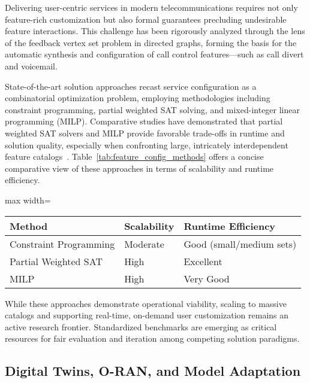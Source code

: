 \documentclass[sigconf]{acmart}
\begin{document}
Delivering user-centric services in modern telecommunications requires not only feature-rich customization but also formal guarantees precluding undesirable feature interactions. This challenge has been rigorously analyzed through the lens of the feedback vertex set problem in directed graphs, forming the basis for the automatic synthesis and configuration of call control features—such as call divert and voicemail.

State-of-the-art solution approaches recast service configuration as a combinatorial optimization problem, employing methodologies including constraint programming, partial weighted SAT solving, and mixed-integer linear programming (MILP). Comparative studies have demonstrated that partial weighted SAT solvers and MILP provide favorable trade-offs in runtime and solution quality, especially when confronting large, intricately interdependent feature catalogs~\cite{ref31}. Table~\ref{tab:feature_config_methods} offers a concise comparative view of these approaches in terms of scalability and runtime efficiency.

\begin{table*}[htbp]
\centering
\caption{Comparison of Feature Configuration Optimization Approaches}
\label{tab:feature_config_methods}
\begin{adjustbox}{max width=\textwidth}
\begin{tabular}{lll}
\toprule
\textbf{Method} & \textbf{Scalability} & \textbf{Runtime Efficiency} \\
\midrule
Constraint Programming     & Moderate         & Good (small/medium sets)   \\
Partial Weighted SAT       & High             & Excellent                  \\
MILP                      & High             & Very Good                  \\
\bottomrule
\end{tabular}
\end{adjustbox}
\end{table*}

While these approaches demonstrate operational viability, scaling to massive catalogs and supporting real-time, on-demand user customization remains an active research frontier. Standardized benchmarks are emerging as critical resources for fair evaluation and iteration among competing solution paradigms.

\subsection{Digital Twins, O-RAN, and Model Adaptation}
\end{document}
